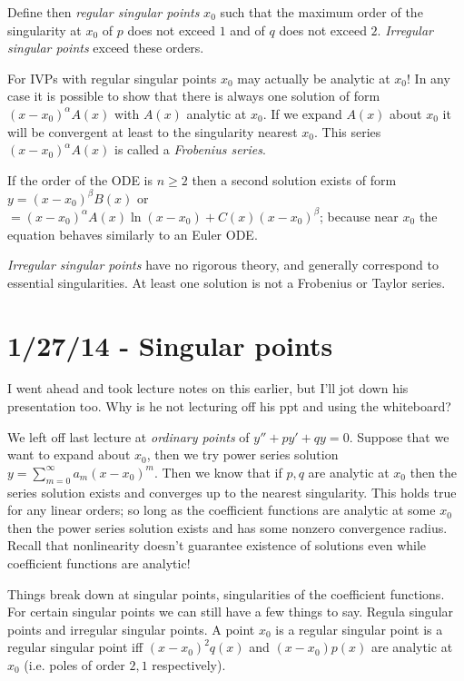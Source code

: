 \documentclass[10pt]{report}
\begin{document}
Define then \emph{regular singular points} $x_0$ such that the maximum order of the singularity at $x_0$ of $p$ does not exceed $1$ and of $q$ does not exceed $2$. \emph{Irregular singular points} exceed these orders.

For IVPs with regular singular points $x_0$ may actually be analytic at $x_0$! In any case it is possible to show that there is always one solution of form $(x-x_0)^\alpha A(x)$ with $A(x)$ analytic at $x_0$. If we expand $A(x)$ about $x_0$ it will be convergent at least to the singularity nearest $x_0$. This series $(x-x_0)^\alpha A(x)$ is called a \emph{Frobenius series}.

If the order of the ODE is $n \geq 2$ then a second solution exists of form $y = (x-x_0)^\beta B(x)$ or $=(x-x_0)^\alpha A(x)\ln(x-x_0) + C(x)(x-x_0)^\beta$; because near $x_0$ the equation behaves similarly to an Euler ODE. 

\emph{Irregular singular points} have no rigorous theory, and generally correspond to essential singularities. At least one solution is not a Frobenius or Taylor series. 

\chapter{1/27/14 - Singular points}

I went ahead and took lecture notes on this earlier, but I'll jot down his presentation too. Why is he not lecturing off his ppt and using the whiteboard?

We left off last lecture at \emph{ordinary points} of $y'' + py' + qy = 0$. Suppose that we want to expand about $x_0$, then we try power series solution $y = \sum_{m=0}^\infty a_m(x-x_0)^m$. Then we know that if $p,q$ are analytic at $x_0$ then the series solution exists and converges up to the nearest singularity. This holds true for any linear orders; so long as the coefficient functions are analytic at some $x_0$ then the power series solution exists and has some nonzero convergence radius. Recall that nonlinearity doesn't guarantee existence of solutions even while coefficient functions are analytic!

Things break down at singular points, singularities of the coefficient functions. For certain singular points we can still have a few things to say. Regula singular points and irregular singular points. A point $x_0$ is a regular singular point is a regular singular point iff $(x-x_0)^2q(x)$ and $(x-x_0)p(x)$ are analytic at $x_0$ (i.e. poles of order $2,1$ respectively). 
\end{document}
